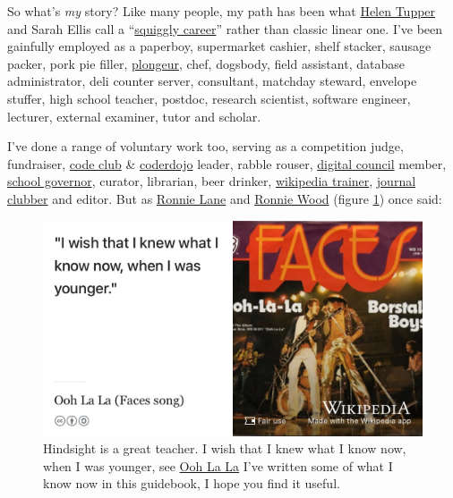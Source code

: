 \documentclass[
]{book}
\begin{document}
So what's \emph{my} story? Like many people, my path has been what \href{https://twitter.com/HelenTupper}{Helen Tupper} and Sarah Ellis call a ``\href{https://www.amazingif.com/books/}{squiggly career}'' rather than classic linear one. \citep{squigglybook, squigglytalk} I've been gainfully employed as a paperboy, supermarket cashier, shelf stacker, sausage packer, pork pie filler, \href{https://en.wikipedia.org/wiki/Plongeur}{plongeur}, chef, dogsbody, field assistant, database administrator, deli counter server, consultant, matchday steward, envelope stuffer, high school teacher, postdoc, research scientist, software engineer, lecturer, external examiner, tutor and scholar.

I've done a range of voluntary work too, serving as a competition judge, fundraiser, \href{https://codeclub.org}{code club} \& \href{https://coderdojo.com}{coderdojo} leader, rabble rouser, \href{https://www.manchesterdigital.com/}{digital council} member, \href{https://governorsforschools.org.uk/}{school governor}, curator, librarian, beer drinker, \href{https://wiki-loves-scientists.org.uk/}{wikipedia trainer}, \href{https://sigcse.cs.manchester.ac.uk/}{journal clubber} and editor. But as \href{https://en.wikipedia.org/wiki/Ronnie_Lane}{Ronnie Lane} and \href{https://en.wikipedia.org/wiki/Ronnie_Wood}{Ronnie Wood} (figure \ref{fig:faces-fig}) once said:

\begin{figure}

{\centering \includegraphics[width=0.99\linewidth]{images/faces} 

}

\caption{Hindsight is a great teacher. I wish that I knew what I know now, when I was younger, see \href{https://en.wikipedia.org/wiki/Ooh_La_La_(Faces_song)}{Ooh La La} \citep{faces} I've written some of what I know now in this guidebook, I hope you find it useful.}\label{fig:faces-fig}
\end{figure}
\end{document}
